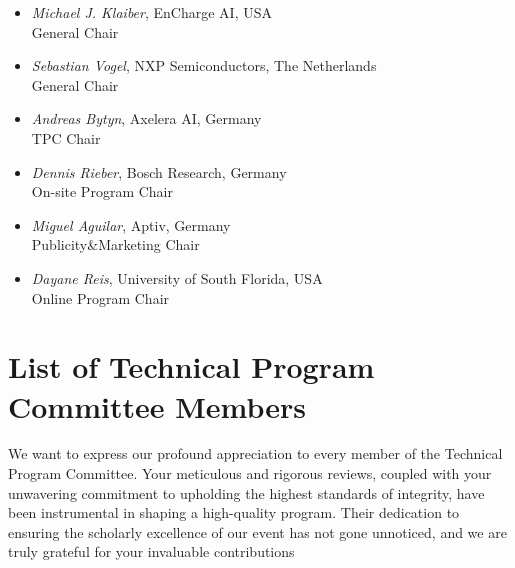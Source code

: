 \documentclass[sigconf]{acmart}
\begin{document}
\begin{itemize}
	\item \textit{Michael J. Klaiber}, EnCharge AI, USA\\ General Chair
	\item \textit{Sebastian Vogel}, NXP Semiconductors, The Netherlands\\ General Chair
		\item \textit{Andreas Bytyn}, Axelera AI, Germany\\ TPC Chair
			\item \textit{Dennis Rieber}, Bosch Research, Germany\\ On-site Program Chair

	\item \textit{Miguel Aguilar}, Aptiv, Germany\\ Publicity\&Marketing Chair
		\item \textit{Dayane Reis}, University of South Florida, USA\\ Online Program Chair
\end{itemize}


\section{List of Technical Program Committee Members}

We want to express our profound appreciation to every member of the Technical Program Committee. Your meticulous and rigorous reviews, coupled with your unwavering commitment to upholding the highest standards of integrity, have been instrumental in shaping a high-quality program. Their  dedication to ensuring the scholarly excellence of our event has not gone unnoticed, and we are truly grateful for your invaluable contributions
\end{document}
